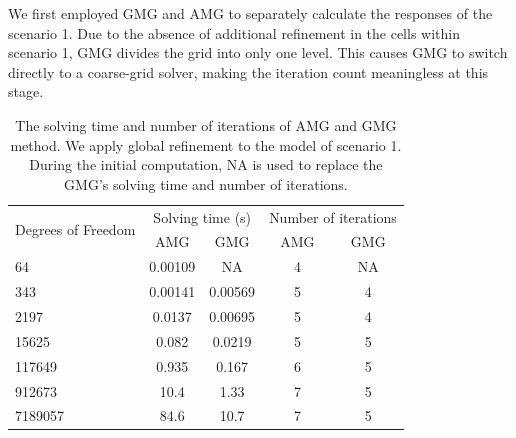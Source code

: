 \documentclass[extra, referee]{gji}
\begin{document}
We first employed GMG and AMG to separately calculate the responses of the
scenario 1. Due to the absence of additional refinement in the cells within
scenario 1, GMG divides the grid into only one level. This causes GMG to switch
directly to a coarse-grid solver, making the iteration count meaningless at this
stage.
\begin{table}
    \centering
    \caption{The solving time and number of iterations of AMG and GMG method. We
      apply global refinement to the model of scenario 1. During the initial
      computation, NA is used to replace the GMG's solving time and number of
      iterations.}
    \begin{tabular}{lcccc}
    \toprule
    \multirow{2}{*}{Degrees of Freedom} & \multicolumn{2}{c}{Solving time (s)} &
    \multicolumn{2}{c}{Number of iterations} \\ \cmidrule(lr){2-3}
    \cmidrule(lr){4-5} & AMG & GMG & AMG & GMG \\ \midrule 64 & 0.00109 & NA & 4
    & NA \\
    343 & 0.00141 & 0.00569 & 5 & 4 \\
    2197 & 0.0137 & 0.00695 & 5 & 4 \\
    15625 & 0.082 & 0.0219 & 5 & 5 \\
    117649 & 0.935 & 0.167 & 6 & 5 \\
    912673 & 10.4 & 1.33 & 7 & 5 \\
    7189057 & 84.6 & 10.7 & 7 & 5 \\ \bottomrule
    \end{tabular}
    \label{table:first}
\end{table}
\end{document}
